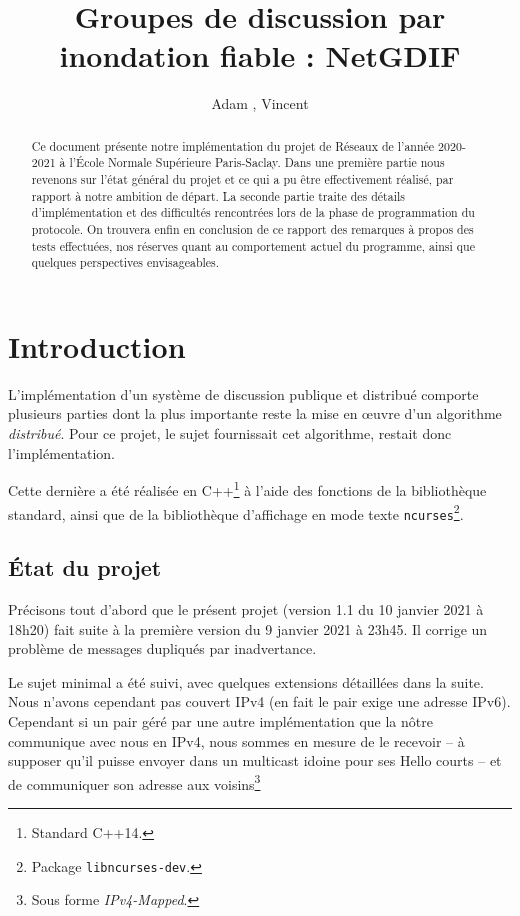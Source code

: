 \documentclass[11pt,a4paper]{article}
\title{Groupes de discussion par inondation fiable : NetGDIF}
\author{Adam \bsc{Phillips}, Vincent \bsc{Bonczak}}
\begin{document}
  \maketitle
	
	\begin{abstract}
	Ce document présente notre implémentation du projet de Réseaux de l'année 2020-2021 à l'École Normale Supérieure Paris-Saclay. Dans une première partie
	nous revenons sur l'état général du projet et ce qui a pu être effectivement réalisé, par rapport à notre ambition de départ. La seconde partie traite 
	des détails d'implémentation et des difficultés rencontrées lors de la phase de programmation du protocole. On trouvera enfin en conclusion de ce rapport
	des remarques à propos des tests effectuées, nos réserves quant au comportement actuel du programme, ainsi que quelques perspectives envisageables.
	

	\end{abstract}
	
	
\section{Introduction}

L'implémentation d'un système de discussion publique et distribué comporte plusieurs parties dont la plus importante reste la mise en œuvre d'un algorithme \emph{distribué}. Pour ce projet, le sujet fournissait cet algorithme, restait donc l'implémentation.

Cette dernière a été réalisée en C++\footnote{Standard C++14.} à l'aide  des fonctions de la bibliothèque standard, ainsi que de la bibliothèque d'affichage en mode texte \texttt{ncurses}\footnote{Package \texttt{libncurses-dev}.}.

\subsection{État du projet}

Précisons tout d'abord que le présent projet (version 1.1 du 10 janvier 2021 à 18h20) fait suite à la première version du 9 janvier 2021 à 23h45. Il corrige
un problème de messages dupliqués par inadvertance.

\medskip

Le sujet minimal a été suivi, avec quelques extensions détaillées dans la suite. Nous n'avons cependant pas couvert IPv4 (en fait le pair exige une adresse IPv6). Cependant si un pair géré par
une autre implémentation que la nôtre communique avec nous en IPv4, nous sommes en mesure de le recevoir -- à supposer qu'il puisse envoyer dans un multicast 
idoine pour ses Hello courts -- et de communiquer son adresse aux voisins\footnote{Sous forme \emph{IPv4-Mapped}.} 
\end{document}
